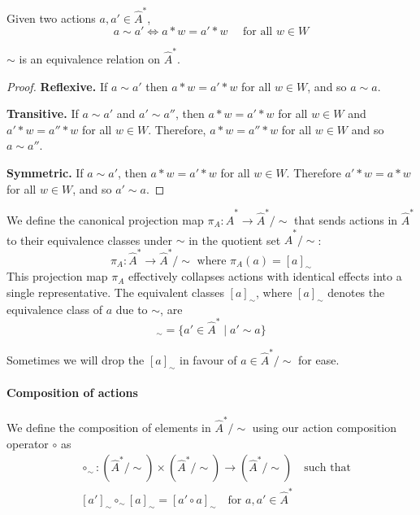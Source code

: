 \begin{definition}
	Given two actions $a, a' \in \hat{A}^{\ast}$,
	\begin{equation}
		a \sim a' \iff a \ast w = a' \ast w \quad \text{ for all $w \in W$}
	\end{equation}
\end{definition}


\begin{proposition}
	$\sim$ is an equivalence relation on $\hat{A}^{\ast}$.
\end{proposition}
\begin{proof}
	\textbf{Reflexive.}
	If $a \sim a'$ then $a \ast w = a' \ast w$ for all $w \in W$, and so $a \sim a$.

	\textbf{Transitive.}
	If $a \sim a'$ and $a' \sim a''$, then $a \ast w = a' \ast w$ for all $w \in W$ and $a' \ast w = a'' \ast w$ for all $w \in W$.
	Therefore, $a \ast w = a'' \ast w$ for all $w \in W$ and so $a \sim a''$.

	\textbf{Symmetric.}
	If $a \sim a'$, then $a \ast w = a' \ast w$ for all $w \in W$.
	Therefore $a' \ast w = a \ast w$ for all $w \in W$, and so $a' \sim a$.
\end{proof}

We define the canonical projection map $\pi_{A}: \hat{A}^{\ast} \to \hat{A}^{\ast}/\sim$ that sends actions in $\hat{A}^{\ast}$ to their equivalence classes under $\sim$ in the quotient set $\hat{A}^{\ast}/\sim$:
\begin{equation}
	\pi_{A}: \hat{A}^{\ast} \to \hat{A}^{\ast}/\sim \text{ where } \pi_{A}(a) = [a]_{\sim}
\end{equation}
This projection map $\pi_{A}$ effectively collapses actions with identical effects into a single representative.
The equivalent classes $[a]_{\sim}$, where $[a]_{\sim}$ denotes the equivalence class of $a$ due to $\sim$, are
\begin{equation}
	[a]_{\sim} = \{ a' \in \hat{A}^{\ast} \mid a' \sim a \}
\end{equation}

Sometimes we will drop the $[a]_{\sim}$ in favour of $a \in \hat{A}^{\ast}/\sim$ for ease.

\paragraph{Composition of actions}
We define the composition of elements in $\hat{A}^{\ast}/\sim$ using our action composition operator $\circ$ as
\begin{equation}
	\begin{aligned}
		 & \circ_{\sim}: (\hat{A}^{\ast}/\sim) \times (\hat{A}^{\ast}/\sim) \to (\hat{A}^{\ast}/\sim) \quad \text{such that} \\
		 & [a']_{\sim} \circ_{\sim} [a]_{\sim} = [a' \circ a]_{\sim} \quad \text{for $a,a' \in \hat{A}^{\ast}$}
	\end{aligned}
\end{equation}


